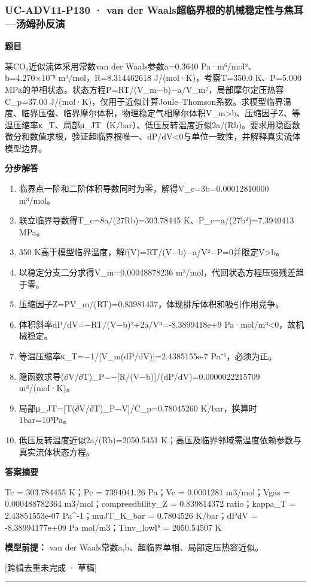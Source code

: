 \documentclass[UTF8,11pt,a4paper]{ctexart}
\begin{document}
\subsubsection*{UC-ADV11-P130 · van der Waals超临界根的机械稳定性与焦耳—汤姆孙反演}
\noindent\textbf{题目}\par
某CO₂近似流体采用常数van der Waals参数a=0.3640 Pa·m⁶/mol²、b=4.270×10⁻⁵ m³/mol，R=8.314462618 J/(mol·K)，考察T=350.0 K、P=5.000 MPa的单相状态。状态方程P=RT/(V\_m−b)−a/V\_m²，局部摩尔定压热容C\_p=37.00 J/(mol·K)，仅用于近似计算Joule–Thomson系数。求模型临界温度、临界压强、临界摩尔体积，物理稳定气相摩尔体积V\_m>b、压缩因子Z、等温压缩率κ\_T、局部μ\_JT（K/bar）、低压反转温度近似2a/(Rb)。要求用隐函数微分和数值求根，验证超临界根唯一、dP/dV<0与单位一致性，并解释真实流体模型边界。\par
\medskip\noindent\textbf{分步解答}
\begin{enumerate}
\item 临界点一阶和二阶体积导数同时为零，解得V\_c=3b=0.00012810000 m³/mol。
\item 联立临界导数得T\_c=8a/(27Rb)=303.78445 K、P\_c=a/(27b²)=7.3940413 MPa。
\item 350 K高于模型临界温度，解f(V)=RT/(V−b)−a/V²−P=0并限定V>b。
\item 以稳定分支二分求得V\_m=0.00048878236 m³/mol，代回状态方程压强残差趋于零。
\item 压缩因子Z=PV\_m/(RT)=0.83981437，体现排斥体积和吸引作用竞争。
\item 体积斜率dP/dV=−RT/(V−b)²+2a/V³=-8.3899418e+9 Pa·mol/m³<0，故机械稳定。
\item 等温压缩率κ\_T=−1/[V\_m(dP/dV)]=2.4385155e-7 Pa⁻¹，必须为正。
\item 隐函数求导(∂V/∂T)\_P=−[R/(V−b)]/(dP/dV)=0.0000022215709 m³/(mol·K)。
\item 局部μ\_JT=[T(∂V/∂T)\_P−V]/C\_p=0.78045260 K/bar，换算时1bar=10⁵Pa。
\item 低压反转温度近似2a/(Rb)=2050.5451 K；高压及临界邻域需温度依赖参数与真实流体状态方程。
\end{enumerate}
\noindent\textbf{答案摘要}\par
Tc = 303.784455 K；Pc = 7394041.26 Pa；Vc = 0.0001281 m3/mol；Vgas = 0.000488782364 m3/mol；compressibility\_Z = 0.839814372 ratio；kappa\_T = 2.43851553e-07 Pa\textasciicircum{}-1；muJT\_K\_bar = 0.7804526 K/bar；dPdV = -8.38994177e+09 Pa mol/m3；Tinv\_lowP = 2050.54507 K\par
\noindent\textbf{模型前提：}
van der Waals常数a,b、超临界单相、局部定压热容近似。\par
\noindent\textcolor{red!65!black}{[跨辑去重未完成 · 草稿]} \par
\medskip\hrule\medskip
\end{document}
